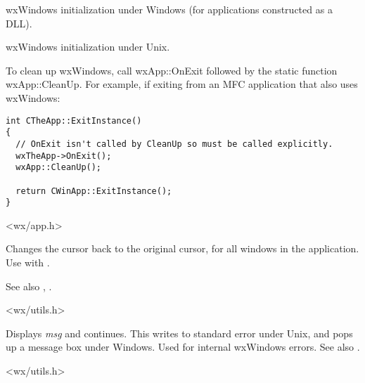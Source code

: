 wxWindows initialization under Windows (for applications constructed as a DLL).


wxWindows initialization under Unix.


To clean up wxWindows, call wxApp::OnExit followed by the static function
wxApp::CleanUp. For example, if exiting from an MFC application that also uses wxWindows:

\begin{verbatim}
int CTheApp::ExitInstance()
{
  // OnExit isn't called by CleanUp so must be called explicitly.
  wxTheApp->OnExit();
  wxApp::CleanUp();

  return CWinApp::ExitInstance();
}
\end{verbatim}


<wx/app.h>

\label{wxendbusycursor}


Changes the cursor back to the original cursor, for all windows in the application.
Use with .

See also , .


<wx/utils.h>

\label{wxerror}


Displays {\it msg} and continues. This writes to standard error under
Unix, and pops up a message box under Windows. Used for internal
wxWindows errors. See also .


<wx/utils.h>

\label{wxexecute}



